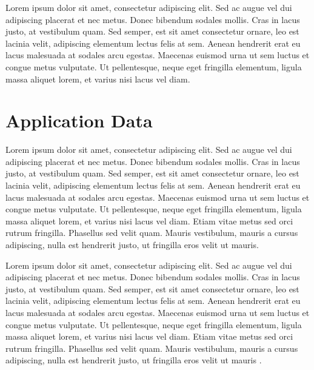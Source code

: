 Lorem ipsum dolor sit amet, consectetur adipiscing elit. Sed ac augue vel dui 
adipiscing placerat et nec metus. Donec bibendum sodales mollis. Cras in lacus 
justo, at vestibulum quam. Sed semper, est sit amet consectetur ornare, leo est 
lacinia velit, adipiscing elementum lectus felis at sem. Aenean hendrerit erat eu 
lacus malesuada at sodales arcu egestas. Maecenas euismod urna ut sem luctus et 
congue metus vulputate. Ut pellentesque, neque eget fringilla elementum, ligula 
massa aliquet lorem, et varius nisi lacus vel diam.

\section{Application Data}

Lorem ipsum dolor sit amet, consectetur adipiscing elit. Sed ac augue vel dui 
adipiscing placerat et nec metus. Donec bibendum sodales mollis. Cras in lacus 
justo, at vestibulum quam. Sed semper, est sit amet consectetur ornare, leo est 
lacinia velit, adipiscing elementum lectus felis at sem. Aenean hendrerit erat eu 
lacus malesuada at sodales arcu egestas. Maecenas euismod urna ut sem luctus et 
congue metus vulputate. Ut pellentesque, neque eget fringilla elementum, ligula 
massa aliquet lorem, et varius nisi lacus vel diam. Etiam vitae metus sed orci 
rutrum fringilla. Phasellus sed velit quam. Mauris vestibulum, mauris a cursus 
adipiscing, nulla est hendrerit justo, ut fringilla eros velit ut mauris.

Lorem ipsum dolor sit amet, consectetur adipiscing elit. Sed ac augue vel dui 
adipiscing placerat et nec metus. Donec bibendum sodales mollis. Cras in lacus 
justo, at vestibulum quam. Sed semper, est sit amet consectetur ornare, leo est 
lacinia velit, adipiscing elementum lectus felis at sem. Aenean hendrerit erat eu 
lacus malesuada at sodales arcu egestas. Maecenas euismod urna ut sem luctus et 
congue metus vulputate. Ut pellentesque, neque eget fringilla elementum, ligula 
massa aliquet lorem, et varius nisi lacus vel diam. Etiam vitae metus sed orci 
rutrum fringilla. Phasellus sed velit quam. Mauris vestibulum, mauris a cursus 
adipiscing, nulla est hendrerit justo, ut fringilla eros velit ut mauris
\cite{Wegener2000629}.



